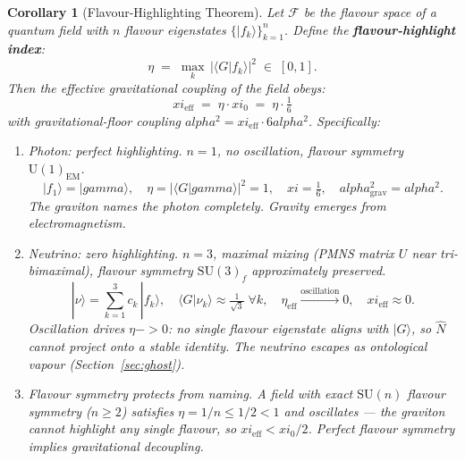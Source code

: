 \documentclass[12pt,a4paper]{article}
\newtheorem{corollary}{Corollary}
\def\to{ -> }%
\def\alpha{alpha}%
\def\gamma{gamma}%
\def\xi{xi}%
\begin{document}
\begin{corollary}[Flavour-Highlighting Theorem]
\label{cor:flavour_formal}
Let $\mathcal{F}$ be the flavour space of a quantum field with $n$ flavour eigenstates $\{|f_k\rangle\}_{k=1}^n$. Define the \textbf{flavour-highlight index}:
\begin{equation}
\eta \;=\; \max_{k}\,|\langle G | f_k \rangle|^2 \;\in\; [0,1].
\end{equation}
Then the effective gravitational coupling of the field obeys:
\begin{equation}
\boxed{\xi_{\mathrm{eff}} \;=\; \eta\cdot\xi_0 \;=\; \eta\cdot\tfrac{1}{6}}
\end{equation}
with gravitational-floor coupling $\alpha^2 = \xi_{\mathrm{eff}}\cdot 6\alpha^2$. Specifically:

\begin{enumerate}
    \item[\textbf{(i)}] \emph{Photon: perfect highlighting.} $n=1$, no oscillation, flavour symmetry $\mathrm{U}(1)_{\mathrm{EM}}$.
    \begin{equation}
        |f_1\rangle = |\gamma\rangle, \quad \eta = |\langle G|\gamma\rangle|^2 = 1, \quad \xi = \tfrac{1}{6}, \quad \alpha^2_{\mathrm{grav}} = \alpha^2.
    \end{equation}
    The graviton names the photon completely. Gravity emerges from electromagnetism.

    \item[\textbf{(ii)}] \emph{Neutrino: zero highlighting.} $n=3$, maximal mixing (PMNS matrix $U$ near tri-bimaximal), flavour symmetry $\mathrm{SU}(3)_f$ approximately preserved.
    \begin{equation}
        |\nu\rangle = \sum_{k=1}^{3} c_k\,|f_k\rangle, \quad
        \langle G|\nu_k\rangle \approx \tfrac{1}{\sqrt{3}}\;\forall k, \quad
        \eta_{\mathrm{eff}} \xrightarrow{\text{oscillation}} 0, \quad \xi_{\mathrm{eff}} \approx 0.
    \end{equation}
    Oscillation drives $\eta \to 0$: no single flavour eigenstate aligns with $|G\rangle$, so $\hat{N}$ cannot project onto a stable identity. The neutrino escapes as \emph{ontological vapour} (Section~\ref{sec:ghost}).

    \item[\textbf{(iii)}] \emph{Flavour symmetry protects from naming.} A field with exact $\mathrm{SU}(n)$ flavour symmetry ($n \geq 2$) satisfies $\eta = 1/n \leq 1/2 < 1$ and oscillates --- the graviton cannot highlight any single flavour, so $\xi_{\mathrm{eff}} < \xi_0/2$. Perfect flavour symmetry implies gravitational decoupling.
\end{enumerate}
\end{corollary}
\end{document}
